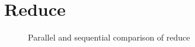 \section{Reduce}
\label{sec:reduce}

\begin{figure}[htb]
  \centering
  
  \caption{Parallel and sequential comparison of reduce}
  \label{fig:par seq reduce}
\end{figure}
